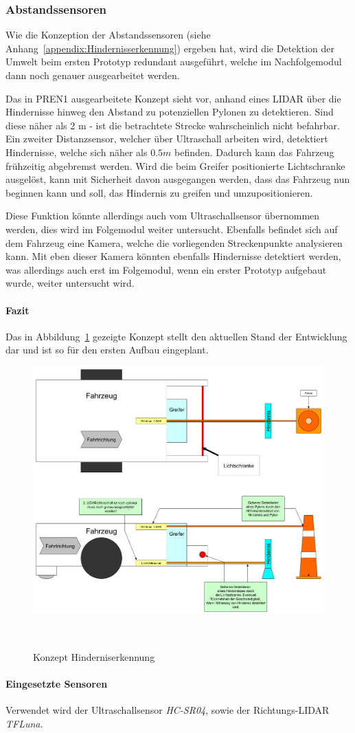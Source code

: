 \documentclass[main.tex]{subfiles} %
\begin{document}

\subsubsection{Abstandssensoren}

Wie die Konzeption der Abstandssensoren (siehe
Anhang~\ref{appendix:Hindernisserkennung}) ergeben hat, wird die Detektion der
Umwelt beim ersten Prototyp redundant ausgeführt, welche im Nachfolgemodul dann
noch genauer ausgearbeitet werden.

Das in PREN1 ausgearbeitete Konzept sieht vor, anhand eines LIDAR über die
Hindernisse hinweg den Abstand zu potenziellen Pylonen zu detektieren. Sind
diese näher als 2 m - ist die betrachtete Strecke wahrscheinlich nicht
befahrbar. Ein zweiter Distanzsensor, welcher über Ultraschall arbeiten wird,
detektiert Hindernisse, welche sich näher als $0.5 m$ befinden. Dadurch kann
das Fahrzeug frühzeitig abgebremst werden. Wird die beim Greifer positionierte
Lichtschranke ausgelöst, kann mit Sicherheit davon ausgegangen werden, dass das
Fahrzeug nun beginnen kann und soll, das Hindernis zu greifen und
umzupositionieren.

Diese Funktion könnte allerdings auch vom Ultraschallsensor übernommen werden,
dies wird im Folgemodul weiter untersucht. Ebenfalls befindet sich auf dem
Fahrzeug eine Kamera, welche die vorliegenden Streckenpunkte analysieren kann.
Mit eben dieser Kamera könnten ebenfalls Hindernisse detektiert werden, was
allerdings auch erst im Folgemodul, wenn ein erster Prototyp aufgebaut wurde,
weiter untersucht wird.

\paragraph{Fazit} Das in Abbildung~\ref{fig:Konzept_Hinderniserkennung} gezeigte Konzept stellt
den aktuellen Stand der Entwicklung dar und ist so für den ersten Aufbau
eingeplant.


\begin{figure}[H]
    \centering
    \includegraphics[width=0.75\linewidth]{./fig_Abstandssensor/Konzept_Hinderniserkennung.pdf}
    \caption{Konzept Hinderniserkennung}~\label{fig:Konzept_Hinderniserkennung}
\end{figure}

\paragraph{Eingesetzte Sensoren}
Verwendet wird der Ultraschallsensor \textit{HC-SR04}, sowie der
Richtungs-LIDAR \textit{TFLuna}.
\end{document}
